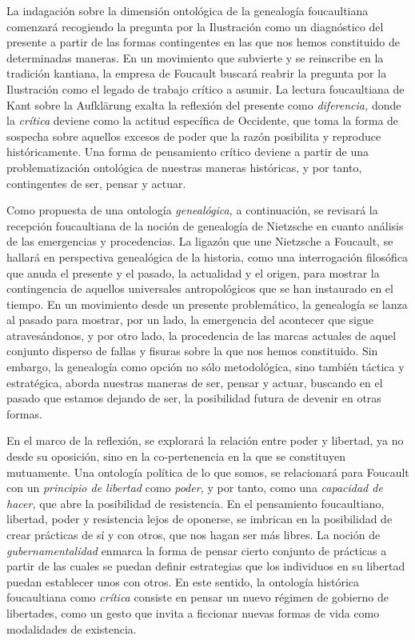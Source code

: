 La indagación sobre la dimensión ontológica de la genealogía foucaultiana comenzará recogiendo la pregunta por la Ilustración como un diagnóstico del presente a partir de las formas contingentes en las que nos hemos constituido de determinadas maneras. En un movimiento que subvierte y se reinscribe en la tradición kantiana, la empresa de Foucault buscará reabrir la pregunta por la Ilustración como el legado de trabajo crítico a asumir. La lectura foucaultiana de Kant sobre la Aufklärung exalta la reflexión del presente como \emph{diferencia,} donde la \emph{crítica} deviene como la actitud específica de Occidente, que toma la forma de sospecha sobre aquellos excesos de poder que la razón posibilita y reproduce históricamente. Una forma de pensamiento crítico deviene a partir de una problematización ontológica de nuestras maneras históricas, y por tanto, contingentes de ser, pensar y actuar.

Como propuesta de una ontología \emph{genealógica,} a continuación, se revisará la recepción foucaultiana de la noción de genealogía de Nietzsche en cuanto análisis de las emergencias y procedencias. La ligazón que une Nietzsche a Foucault, se hallará en perspectiva genealógica de la historia, como una interrogación filosófica que anuda el presente y el pasado, la actualidad y el origen, para mostrar la contingencia de aquellos universales antropológicos que se han instaurado en el tiempo. En un movimiento desde un presente problemático, la genealogía se lanza al pasado para mostrar, por un lado, la emergencia del acontecer que sigue atravesándonos, y por otro lado, la procedencia de las marcas actuales de aquel conjunto disperso de fallas y fisuras sobre la que nos hemos constituido. Sin embargo, la genealogía como opción no sólo metodológica, sino también táctica y estratégica, aborda nuestras maneras de ser, pensar y actuar, buscando en el pasado que estamos dejando de ser, la posibilidad futura de devenir en otras formas.

En el marco de la reflexión, se explorará la relación entre poder y libertad, ya no desde su oposición, sino en la co-pertenencia en la que se constituyen mutuamente. Una ontología política de lo que somos, se relacionará para Foucault con un \emph{principio de libertad} como \emph{poder,} y por tanto, como una \emph{capacidad de hacer,} que abre la posibilidad de resistencia. En el pensamiento foucaultiano, libertad, poder y resistencia lejos de oponerse, se imbrican en la posibilidad de crear prácticas de sí y con otros, que nos hagan ser más libres. La noción de \emph{gubernamentalidad} enmarca la forma de pensar cierto conjunto de prácticas a partir de las cuales se puedan definir estrategias que los individuos en su libertad puedan establecer unos con otros. En este sentido, la ontología histórica foucaultiana como \emph{crítica} consiste en pensar un nuevo régimen de gobierno de libertades, como un gesto que invita a ficcionar nuevas formas de vida como modalidades de existencia.

